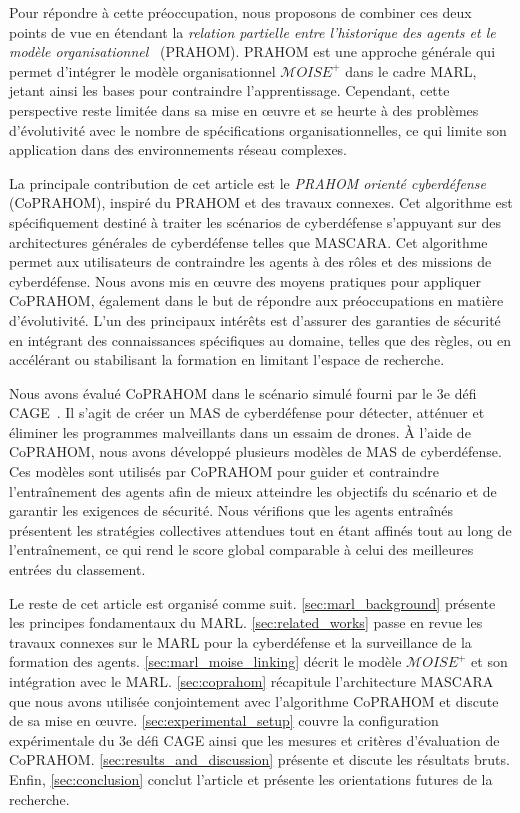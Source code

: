 Pour répondre à cette préoccupation, nous proposons de combiner ces deux points de vue en étendant la \textit{relation partielle entre l'historique des agents et le modèle organisationnel}~\cite{soule2024} (PRAHOM). PRAHOM est une approche générale qui permet d'intégrer le modèle organisationnel $\mathcal{M}OISE^+$ dans le cadre MARL, jetant ainsi les bases pour contraindre l'apprentissage. Cependant, cette perspective reste limitée dans sa mise en œuvre et se heurte à des problèmes d'évolutivité avec le nombre de spécifications organisationnelles, ce qui limite son application dans des environnements réseau complexes.

La principale contribution de cet article est le \textit{PRAHOM orienté cyberdéfense} (CoPRAHOM), inspiré du PRAHOM et des travaux connexes. Cet algorithme est spécifiquement destiné à traiter les scénarios de cyberdéfense s'appuyant sur des architectures générales de cyberdéfense telles que MASCARA. Cet algorithme permet aux utilisateurs de contraindre les agents à des rôles et des missions de cyberdéfense. Nous avons mis en œuvre des moyens pratiques pour appliquer CoPRAHOM, également dans le but de répondre aux préoccupations en matière d'évolutivité. L'un des principaux intérêts est d'assurer des garanties de sécurité en intégrant des connaissances spécifiques au domaine, telles que des règles, ou en accélérant ou stabilisant la formation en limitant l'espace de recherche.

Nous avons évalué CoPRAHOM dans le scénario simulé fourni par le 3e défi CAGE~\cite{cage_challenge_3_announcement}. Il s'agit de créer un MAS de cyberdéfense pour détecter, atténuer et éliminer les programmes malveillants dans un essaim de drones. À l'aide de CoPRAHOM, nous avons développé plusieurs modèles de MAS de cyberdéfense. Ces modèles sont utilisés par CoPRAHOM pour guider et contraindre l'entraînement des agents afin de mieux atteindre les objectifs du scénario et de garantir les exigences de sécurité. Nous vérifions que les agents entraînés présentent les stratégies collectives attendues tout en étant affinés tout au long de l'entraînement, ce qui rend le score global comparable à celui des meilleures entrées du classement.

Le reste de cet article est organisé comme suit. \autoref{sec:marl_background} présente les principes fondamentaux du MARL. \autoref{sec:related_works} passe en revue les travaux connexes sur le MARL pour la cyberdéfense et la surveillance de la formation des agents. \autoref{sec:marl_moise_linking} décrit le modèle $\mathcal{M}OISE^+$ et son intégration avec le MARL. \autoref{sec:coprahom} récapitule l'architecture MASCARA que nous avons utilisée conjointement avec l'algorithme CoPRAHOM et discute de sa mise en œuvre. \autoref{sec:experimental_setup} couvre la configuration expérimentale du 3e défi CAGE ainsi que les mesures et critères d'évaluation de CoPRAHOM. \autoref{sec:results_and_discussion} présente et discute les résultats bruts. Enfin, \autoref{sec:conclusion} conclut l'article et présente les orientations futures de la recherche.


